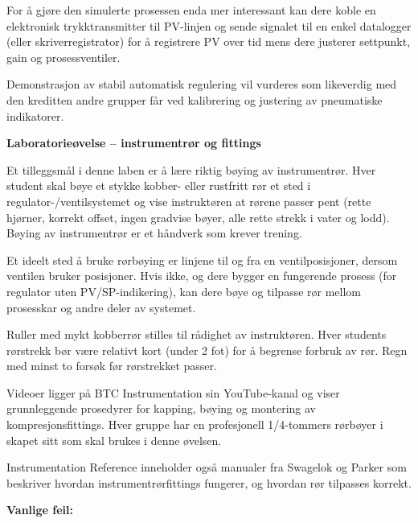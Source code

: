 For å gjøre den simulerte prosessen enda mer interessant kan dere koble en elektronisk trykktransmitter til PV-linjen og sende signalet til en enkel datalogger (eller skriverregistrator) for å registrere PV over tid mens dere justerer settpunkt, gain og prosessventiler.

\vskip 10pt

Demonstrasjon av stabil automatisk regulering vil vurderes som likeverdig med den kreditten andre grupper får ved kalibrering og justering av pneumatiske indikatorer.



\vfil \eject

\noindent
{\bf Laboratorieøvelse -- instrumentrør og fittings}

\vskip 5pt

Et tilleggsmål i denne laben er å lære riktig bøying av instrumentrør. Hver student skal bøye et stykke kobber- eller rustfritt rør et sted i regulator-/ventilsystemet og vise instruktøren at rørene passer pent (rette hjørner, korrekt offset, ingen gradvise bøyer, alle rette strekk i vater og lodd). Bøying av instrumentrør er et håndverk som krever trening.

Et ideelt sted å bruke rørbøying er linjene til og fra en ventilposisjoner, dersom ventilen bruker posisjoner. Hvis ikke, og dere bygger en fungerende prosess (for regulator uten PV/SP-indikering), kan dere bøye og tilpasse rør mellom prosesskar og andre deler av systemet.

Ruller med mykt kobberrør stilles til rådighet av instruktøren. Hver students rørstrekk bør være relativt kort (under 2 fot) for å begrense forbruk av rør. Regn med minst to forsøk før rørstrekket passer.

Videoer ligger på BTC Instrumentation sin YouTube-kanal og viser grunnleggende prosedyrer for kapping, bøying og montering av kompresjonsfittings. Hver gruppe har en profesjonell 1/4-tommers rørbøyer i skapet sitt som skal brukes i denne øvelsen.

Instrumentation Reference inneholder også manualer fra Swagelok og Parker som beskriver hvordan instrumentrørfittings fungerer, og hvordan rør tilpasses korrekt.

\vskip 10pt

{\bf Vanlige feil:}

